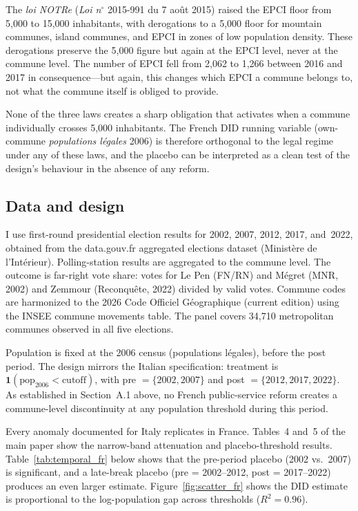 \documentclass[12pt,letterpaper]{article}
\begin{document}
The \textit{loi NOTRe} (\textit{Loi n}$^{\circ}$ 2015-991 du 7 ao\^ut 2015) raised the EPCI floor from 5{,}000 to 15{,}000 inhabitants, with derogations to a 5{,}000 floor for mountain communes, island communes, and EPCI in zones of low population density. These derogations preserve the 5{,}000 figure but again at the EPCI level, never at the commune level. The number of EPCI fell from 2{,}062 to 1{,}266 between 2016 and 2017 in consequence---but again, this changes which EPCI a commune belongs to, not what the commune itself is obliged to provide.

None of the three laws creates a sharp obligation that activates when a commune individually crosses 5{,}000 inhabitants. The French DID running variable (own-commune \textit{populations l\'egales} 2006) is therefore orthogonal to the legal regime under any of these laws, and the placebo can be interpreted as a clean test of the design's behaviour in the absence of any reform.

\subsection{Data and design}

I use first-round presidential election results for 2002, 2007, 2012, 2017, and~2022, obtained from the data.gouv.fr aggregated elections dataset (Minist\`ere de l'Int\'erieur). Polling-station results are aggregated to the commune level. The outcome is far-right vote share: votes for Le Pen (FN/RN) and M\'egret (MNR, 2002) and Zemmour (Reconqu\^ete, 2022) divided by valid votes. Commune codes are harmonized to the 2026 Code Officiel G\'eographique (current edition) using the INSEE commune movements table. The panel covers 34,710 metropolitan communes observed in all five elections.

Population is fixed at the 2006 census (populations l\'egales), before the post period. The design mirrors the Italian specification: treatment is $\mathbf{1}(\text{pop}_{\text{2006}} < \text{cutoff})$, with pre $= \{2002, 2007\}$ and post $= \{2012, 2017, 2022\}$. As established in Section~A.1 above, no French public-service reform creates a commune-level discontinuity at any population threshold during this period.

Every anomaly documented for Italy replicates in France. Tables~4 and~5 of the main paper show the narrow-band attenuation and placebo-threshold results. Table~\ref{tab:temporal_fr} below shows that the pre-period placebo (2002 vs.\ 2007) is significant, and a late-break placebo (pre = 2002--2012, post = 2017--2022) produces an even larger estimate. Figure~\ref{fig:scatter_fr} shows the DID estimate is proportional to the log-population gap across thresholds ($R^2 = 0.96$).
\end{document}
